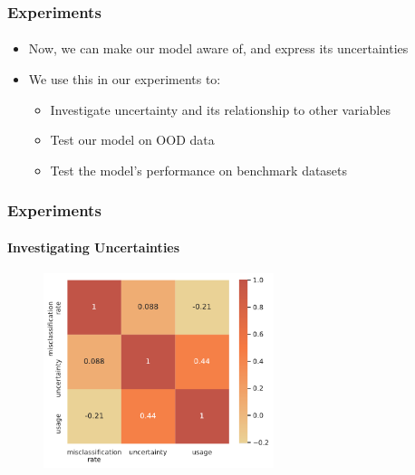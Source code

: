 \documentclass[9pt]{beamer}
\begin{document}
\begin{frame}
\frametitle{Experiments}
\framesubtitle{}
\begin{itemize}
	\item Now, we can make our model aware of, and express its uncertainties
	\item We use this in our experiments to:
	\begin{itemize}
		\item Investigate uncertainty and its relationship to other variables
		\item Test our model on OOD data
		\item Test the model's performance on benchmark datasets
	\end{itemize}
\end{itemize}
\end{frame}



\begin{frame}	
\frametitle{Experiments}
\framesubtitle{Investigating Uncertainties}
	\begin{figure}
		\centering
		\includegraphics[width=0.6\textwidth]{images/corr_matrix.pdf}
	\end{figure}
\end{frame}
\end{document}
